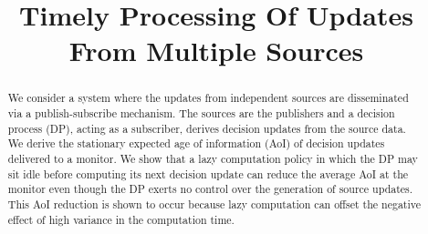 \documentclass[conference, 10pt]{IEEEtran}
\begin{document}
\title{Timely Processing Of Updates From Multiple Sources} 


\author{
}


\maketitle

\begin{abstract}
We consider a system where the updates from independent sources are disseminated via a 
publish-subscribe mechanism. The sources are the publishers
and a decision process (DP), acting as a subscriber, derives decision updates from the source data.
We derive the stationary expected age of information (AoI) of decision updates delivered to a monitor. 
We show that a lazy computation policy in which the DP may sit idle before computing its next decision update can reduce the average AoI at the monitor even though the DP exerts no control over the generation of source updates. 
This AoI reduction is shown to occur because lazy computation can offset the negative effect of high variance in the computation time.  
\end{abstract}
\end{document}
